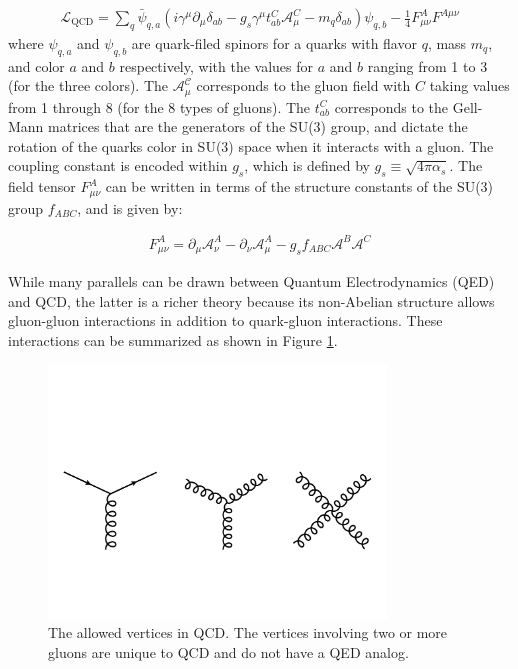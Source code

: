 \begin{align}
\mathcal{{L}}_{\mathrm{QCD}} = \sum_q \bar{\psi}_{q,a} (i \gamma^\mu \partial_\mu \delta_{ab} - g_s \gamma^\mu t_{ab}^C \mathcal{A}_\mu^C - m_q \delta_{ab}) \psi_{q,b} - \frac{1}{4} F_{\mu\nu}^A F^{A \mu\nu}
\end{align}
where $\psi_{q,a}$ and $\psi_{q,b}$ are quark-filed spinors for a quarks with flavor $q$, mass $m_q$, and color $a$ and $b$ respectively, with the values for $a$ and $b$ ranging  from 1 to 3 (for the three colors). The $\mathcal{A_\mu^C}$ corresponds to the gluon field with $C$ taking values from 1 through 8 (for the 8 types of gluons). The $t_{ab}^C$ corresponds to the Gell-Mann matrices that are the generators of the SU(3) group, and dictate the rotation of the quarks color in SU(3) space when it interacts with a gluon. The coupling constant is encoded within $g_s$, which is defined by $g_s \equiv \sqrt{4 \pi \alpha_s}$. The field tensor $F_{\mu\nu}^A$ can be written in terms of the structure constants of the SU(3) group $f_{ABC}$, and is given by:

\begin{align}
F_{\mu\nu}^A = \partial_\mu \mathcal{A}_\nu^A - \partial_\nu \mathcal{A}_\mu^A - g_s f_{ABC} \mathcal{A}^B \mathcal{A}^C
\end{align}


While many parallels can be drawn between Quantum Electrodynamics (QED) and QCD, the latter is a richer theory because its non-Abelian structure allows gluon-gluon interactions in addition to quark-gluon interactions. These interactions can be summarized as shown in Figure \ref{fig:qcd_diagrams}.

\begin{figure}[htbp]
\begin{center}
\includegraphics[width=0.8\textwidth]{figures/theory/qcd_diagrams}
\caption{The allowed vertices in QCD. The vertices involving two or more gluons are unique to QCD and do not have a QED analog. }
\label{fig:qcd_diagrams}
\end{center}
\end{figure}


